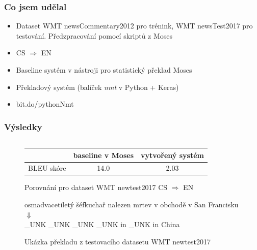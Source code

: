 \documentclass[pdf,fyma2]{beamer}
\begin{document}
\begin{frame}
\frametitle{Co jsem udělal}
        \begin{itemize}
            \item Dataset WMT newsCommentary2012 pro trénink, WMT newsTest2017 pro testování. Předzpracování pomocí skriptů z Moses
            \item CS $\Rightarrow$ EN
            \item Baseline systém v nástroji pro statistický překlad Moses
            \item Překladový systém (balíček \emph{nmt} v Python + Keras)
    \item bit.do/pythonNmt
        \end{itemize}
\end{frame}


\begin{frame}
\frametitle{Výsledky}
  \begin{columns}[T]
    \begin{column}{1.0\textwidth}

        \begin{figure}[h]
            \begin{center}
                \begin{tabular}{c|c|c}
                  & baseline v Moses & vytvořený systém \\
                  \hline
                  BLEU skóre & 14.0 & 2.03\\
                  \hline
                \end{tabular}
            \end{center}
        	\caption{Porovnání pro dataset WMT newtest2017 CS $\Rightarrow$ EN}
        	\label{table:results}
        \end{figure}

        \begin{figure}
            \begin{center}
                osmadvacetiletý šéfkuchař nalezen mrtev v obchodě v San Francisku \\ $\Downarrow$ \\
                \_UNK \_UNK \_UNK \_UNK in \_UNK in China
            \end{center}
        	\caption{Ukázka překladu z testovacího datasetu WMT newtest2017}
        \end{figure}

    \end{column}

  \end{columns}
\end{frame}
\end{document}
